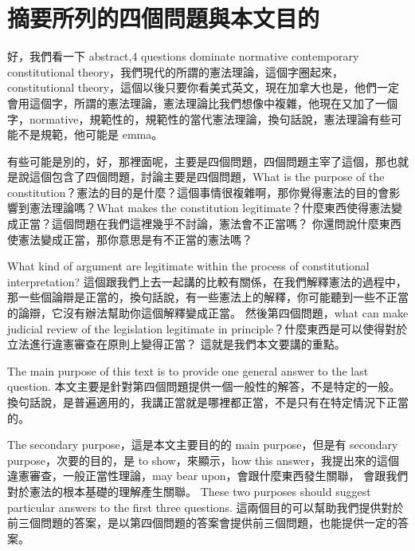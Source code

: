 \section{摘要所列的四個問題與本文目的}

\hypertarget{w02:cue:5}{}好，我們看一下 abstract,4 questions dominate normative contemporary constitutional theory，我們現代的所謂的憲法理論，這個字圈起來，constitutional theory，這個以後只要你看美式英文，現在加拿大也是，他們一定會用這個字，所謂的憲法理論，憲法理論比我們想像中複雜，他現在又加了一個字，normative，規範性的，規範性的當代憲法理論，換句話說，憲法理論有些可能不是規範，他可能是 emma。

\hypertarget{w02:cue:6}{}有些可能是別的，好，那裡面呢，主要是四個問題，四個問題主宰了這個，那也就是說這個包含了四個問題，討論主要是四個問題，What is the purpose of the constitution？憲法的目的是什麼？這個事情很複雜啊，那你覺得憲法的目的會影響到憲法理論嗎？What makes the constitution legitimate？什麼東西使得憲法變成正當？這個問題在我們這裡幾乎不討論，憲法會不正當嗎？
\hypertarget{w02:cue:7}{}你還問說什麼東西使憲法變成正當，那你意思是有不正當的憲法嗎？

\hypertarget{w02:cue:8}{}What kind of argument are legitimate within the process of constitutional interpretation?
\hypertarget{w02:cue:9}{}這個跟我們上去一起講的比較有關係，在我們解釋憲法的過程中，那一些個論辯是正當的，換句話說，有一些憲法上的解釋，你可能聽到一些不正當的論辯，它沒有辦法幫助你這個解釋變成正當。
\hypertarget{w02:cue:10}{}然後第四個問題，what can make judicial review of the legislation legitimate in principle？什麼東西是可以使得對於立法進行違憲審查在原則上變得正當？
\hypertarget{w02:cue:11}{}這就是我們本文要講的重點。

\hypertarget{w02:cue:12}{}The main purpose of this text is to provide one general answer to the last question.
\hypertarget{w02:cue:13}{}本文主要是針對第四個問題提供一個一般性的解答，不是特定的一般。
\hypertarget{w02:cue:14}{}換句話說，是普遍適用的，我講正當就是哪裡都正當，不是只有在特定情況下正當的。

\hypertarget{w02:cue:15}{}The secondary purpose，這是本文主要目的的 main purpose，但是有 secondary purpose，次要的目的，是 to show，來顯示，how this answer，我提出來的這個違憲審查，一般正當性理論，may bear upon，會跟什麼東西發生關聯，
\hypertarget{w02:cue:16}{}會跟我們對於憲法的根本基礎的理解產生關聯。
\hypertarget{w02:cue:17}{}These two purposes should suggest particular answers to the first three questions.
\hypertarget{w02:cue:18}{}這兩個目的可以幫助我們提供對於前三個問題的答案，是以第四個問題的答案會提供前三個問題，也能提供一定的答案。

